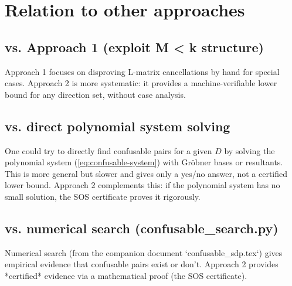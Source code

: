 \documentclass[12pt,a4paper]{article}
\begin{document}
\section{Relation to other approaches}
\label{sec:comparison}

\subsection*{vs. Approach 1 (exploit M < k structure)}

Approach 1 focuses on disproving L-matrix cancellations by hand for special cases.
Approach 2 is more systematic: it provides a machine-verifiable lower bound for any
direction set, without case analysis.

\subsection*{vs. direct polynomial system solving}

One could try to directly find confusable pairs for a given $D$ by solving the
polynomial system (\ref{eq:confusable-system}) with Gröbner bases or resultants.
This is more general but slower and gives only a yes/no answer, not a certified
lower bound.  Approach 2 complements this: if the polynomial system has no small
solution, the SOS certificate proves it rigorously.

\subsection*{vs. numerical search (confusable\_search.py)}

Numerical search (from the companion document `confusable_sdp.tex`) gives empirical
evidence that confusable pairs exist or don't.  Approach 2 provides *certified* evidence
via a mathematical proof (the SOS certificate).
\end{document}
